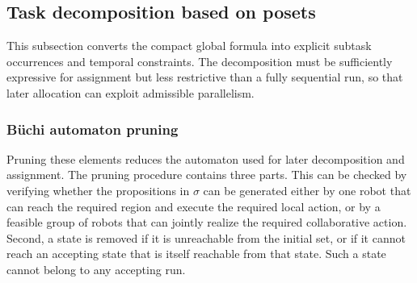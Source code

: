 \subsection{Task decomposition based on posets}
\label{ch04:subsec:task-decompose-posets}

This subsection converts the compact global formula into explicit subtask
occurrences and temporal constraints. The decomposition must be sufficiently
expressive for assignment but less restrictive than a fully sequential run, so
that later allocation can exploit admissible parallelism.

\subsubsection{B\"{u}chi automaton pruning}
\label{ch04:subsubsec:NBA-pruning}

  Pruning these elements reduces the automaton used for later
decomposition and assignment.
The pruning procedure contains three parts.  This can be checked by verifying whether the
propositions in $\sigma$ can be generated either by one robot that can reach
the required region and execute the required local action, or by a feasible
group of robots that can jointly realize the required collaborative action.
Second, a state is removed if it is unreachable from the initial set, or if
it cannot reach an accepting state that is itself reachable from that state.
Such a state cannot belong to any accepting run. 


